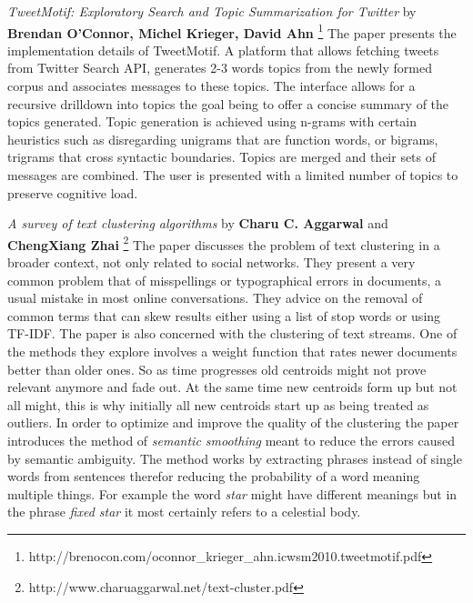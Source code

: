 \textit{TweetMotif: Exploratory Search and Topic Summarization for Twitter} by \textbf{Brendan O’Connor, Michel Krieger, David Ahn} \footnote{http://brenocon.com/oconnor_krieger_ahn.icwsm2010.tweetmotif.pdf}
\newline
The paper presents the implementation details of TweetMotif. A platform that allows fetching tweets from Twitter Search API, generates 2-3 words topics from the newly formed corpus and associates messages to these topics.
\newline
The interface allows for a recursive drilldown into topics the goal being to offer a concise summary of the topics generated. Topic generation is achieved using n-grams with certain heuristics such as disregarding unigrams that are function words, or bigrams, trigrams that cross syntactic boundaries. Topics are merged and their sets of messages are combined. The user is presented with a limited number of topics to preserve cognitive load.

\textit{A survey of text clustering algorithms} by \textbf{Charu C. Aggarwal} and \textbf{ChengXiang Zhai} \footnote{http://www.charuaggarwal.net/text-cluster.pdf}
\newline
The paper discusses the problem of text clustering in a broader context, not only related to social networks. They present a very common problem that of misspellings or typographical errors in documents, a usual mistake in most online conversations. They advice on the removal of common terms that can skew results either using a list of stop words or using TF-IDF.
\newline
The paper is also concerned with the clustering of text streams. One of the methods they explore involves a weight function that rates newer documents better than older ones. So as time progresses old centroids might not prove relevant anymore and fade out. At the same time new centroids form up but not all might, this is why initially all new centroids start up as being treated as outliers.
\newline
In order to optimize and improve the quality of the clustering the paper introduces the method of \textit{semantic smoothing} meant to reduce the errors caused by semantic ambiguity. The method works by extracting phrases instead of single words from sentences therefor reducing the probability of a word meaning multiple things. For example the word \textit{star} might have different meanings but in the phrase \textit{fixed star} it most certainly refers to a celestial body.

